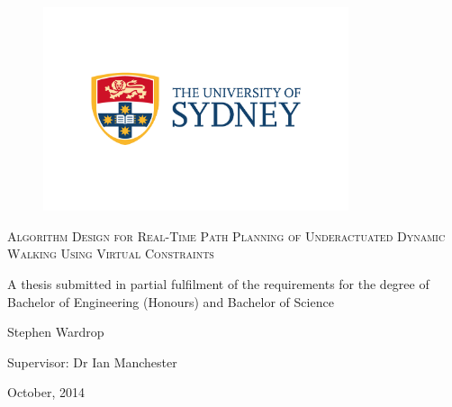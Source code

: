 \thispagestyle{empty}
\begin{titlepage}
\setcounter{page}{1}
\begin{center}

\begin{figure}[H]
\centering
\includegraphics[width = 0.8\textwidth]{Images/usyd.jpg}
\end{figure}

\doublespacing
\textsc{ \LARGE Algorithm Design for Real-Time Path Planning of Underactuated Dynamic Walking Using Virtual Constraints}

\vspace{2cm}

\singlespacing
A thesis submitted in partial fulfilment of the requirements for the degree of \\ Bachelor of Engineering (Honours) and Bachelor of Science

\vspace{2cm}

\large
Stephen Wardrop

\vspace{0.5cm}
\normalsize
Supervisor: Dr Ian Manchester

\vfill

October, 2014

\end{center}
\end{titlepage}
\pagebreak
~
\thispagestyle{empty}
\setcounter{page}{2}
\pagebreak
